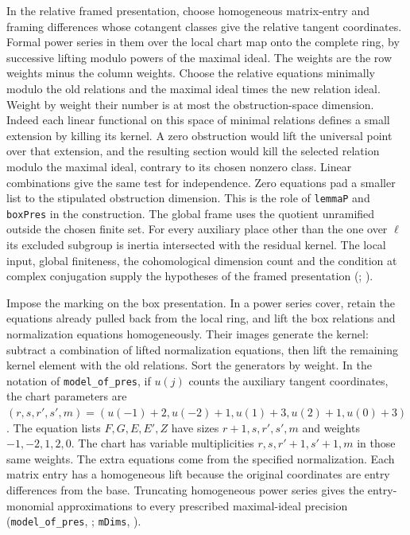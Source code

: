 In the relative framed presentation, choose homogeneous matrix-entry
and framing differences whose cotangent classes give the relative
tangent coordinates. Formal power series in them over the local chart
map onto the complete ring, by successive lifting modulo powers of
the maximal ideal. The weights are the row weights minus the column
weights. Choose the relative equations minimally modulo the old
relations and the maximal ideal times the new relation ideal.
Weight by weight their number is at most the obstruction-space
dimension. Indeed each linear functional on this space of minimal
relations defines a small extension by killing its kernel. A zero
obstruction would lift the universal point over that extension, and
the resulting section would kill the selected relation modulo the maximal
ideal, contrary to its chosen nonzero class. Linear combinations give
the same test for independence. Zero equations pad a smaller list to
the stipulated obstruction dimension. This is the role of
\nolinkurl{lemmaP} and \nolinkurl{boxPres} in the construction.
The global frame uses the quotient unramified outside the chosen finite
set. For every auxiliary place other than the one over $\ell$ its
excluded subgroup is inertia intersected with the residual kernel.
The local input, global finiteness, the cohomological dimension count
and the condition at complex conjugation supply the hypotheses of
the framed presentation
(;
).

Impose the marking on the box presentation. In a power series
cover, retain the equations already pulled back from the local ring,
and lift the box relations and normalization equations homogeneously.
Their images generate the kernel: subtract a combination of lifted
normalization equations, then lift the remaining kernel element with
the old relations. Sort the generators by weight. In the notation of
\nolinkurl{model_of_pres}, if $u(j)$ counts the auxiliary tangent
coordinates, the chart parameters are
$(r,s,r',s',m)=(u(-1)+2,u(-2)+1,u(1)+3,u(2)+1,u(0)+3)$.
The equation lists $F,G,E,E',Z$ have sizes $r+1,s,r',s',m$ and
weights $-1,-2,1,2,0$. The chart has variable multiplicities
$r,s,r'+1,s'+1,m$ in those same weights. The extra equations come
from the specified normalization. Each matrix entry has a homogeneous
lift because the original coordinates are entry differences from the
base. Truncating homogeneous power series gives the entry-monomial
approximations to every prescribed maximal-ideal precision
(\nolinkurl{model_of_pres},
;
\nolinkurl{mDims}, ).

